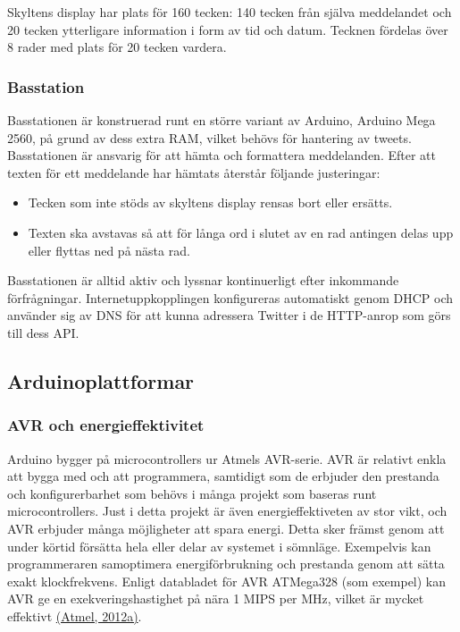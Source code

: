 \documentclass[a4paper,11pt]{article}
\begin{document}
Skyltens display har plats för 160 tecken: 140 tecken från själva meddelandet och 20 tecken ytterligare information i form av tid och datum. Tecknen fördelas över 8 rader med plats för 20 tecken vardera.

\subsubsection{Basstation}
Basstationen är konstruerad runt en större variant av Arduino, Arduino Mega 2560, på grund av dess extra RAM, vilket behövs för hantering av tweets. Basstationen är ansvarig för att hämta och formattera meddelanden. Efter att texten för ett meddelande har hämtats återstår följande justeringar:
	
	\begin{itemize}
    	\item Tecken som inte stöds av skyltens display rensas bort eller ersätts.
    	\item Texten ska avstavas så att för långa ord i slutet av en rad antingen delas upp eller flyttas ned på nästa rad.	
	\end{itemize}
	
Basstationen är alltid aktiv och lyssnar kontinuerligt efter inkommande förfrågningar. Internetuppkopplingen konfigureras automatiskt genom DHCP och använder sig av DNS för att kunna adressera Twitter i de HTTP-anrop som görs till dess API.

\subsection{Arduinoplattformar}

\subsubsection{AVR och energieffektivitet}
Arduino bygger på microcontrollers ur Atmels AVR-serie. AVR är relativt enkla att bygga med och att programmera, samtidigt som de erbjuder den prestanda och konfigurerbarhet som behövs i många projekt som baseras runt microcontrollers. Just i detta projekt är även energieffektiveten av stor vikt, och AVR erbjuder många möjligheter att spara energi. Detta sker främst genom att under körtid försätta hela eller delar av systemet i sömnläge. Exempelvis kan programmeraren samoptimera energiförbrukning och prestanda genom att sätta exakt klockfrekvens. Enligt databladet för AVR ATMega328 (som exempel) kan AVR ge en exekveringshastighet på nära 1 MIPS per MHz, vilket är mycket effektivt \hyperref[atmel]{(Atmel, 2012a)}. \\
\end{document}
